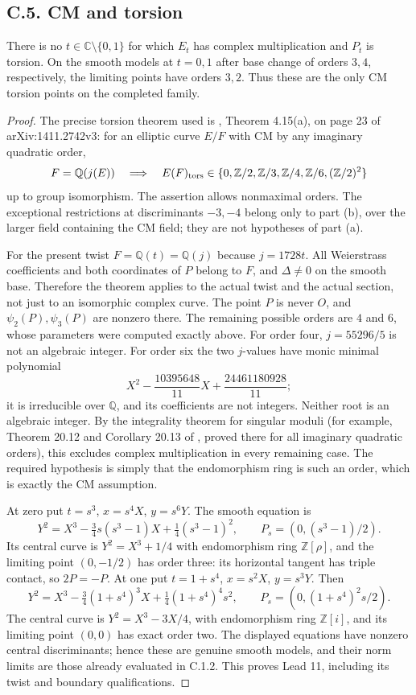 \subsection{C.5. CM and torsion}
\begin{proposition}\label{ari:C.5.1}
There is no $t\in\mathbb C\setminus\{0,1\}$ for which $E_t$ has
complex multiplication and $P_t$ is torsion. On the smooth models
at $t=0,1$ after base change of orders $3,4$, respectively, the
limiting points have orders $3,2$. Thus these are the only CM
torsion points on the completed family.
\end{proposition}
\begin{proof}
The precise torsion theorem used is \cite{BourdonClarkStankewicz2017},
Theorem 4.15(a), on page 23 of arXiv:1411.2742v3:
for an elliptic curve $E/F$ with CM by any imaginary quadratic order,
\[
 F=\mathbb Q(j(E))\quad\Longrightarrow\quad
 E(F)_{\rm tors}\in
 \{0,\mathbb Z/2,\mathbb Z/3,\mathbb Z/4,
       \mathbb Z/6,(\mathbb Z/2)^2\}
\]
up to group isomorphism. The assertion allows nonmaximal orders.
The exceptional restrictions at discriminants $-3,-4$ belong only
to part (b), over the larger field containing the CM field; they
are not hypotheses of part (a).

For the present twist $F=\mathbb Q(t)=\mathbb Q(j)$ because
$j=1728t$. All Weierstrass coefficients and both coordinates of
$P$ belong to $F$, and $\Delta\ne0$ on the smooth base. Therefore
the theorem applies to the actual twist and the actual section,
not just to an isomorphic complex curve. The point $P$ is never
$O$, and $\psi_2(P),\psi_3(P)$ are nonzero there. The remaining
possible orders are $4$ and $6$, whose parameters were computed
exactly above. For order four, $j=55296/5$ is not an algebraic
integer. For order six the two $j$-values have monic minimal
polynomial
\[
 X^2-\frac{10395648}{11}X+\frac{24461180928}{11};
\]
it is irreducible over $\mathbb Q$, and its coefficients are not
integers. Neither root is an algebraic integer. By the integrality
theorem for singular moduli (for example, Theorem 20.12 and
Corollary 20.13 of \cite{Sutherland2023CM}, proved there for all
imaginary quadratic orders), this excludes complex multiplication
in every remaining case. The required hypothesis is simply that
the endomorphism ring is such an order, which is exactly the CM
assumption.

At zero put $t=s^3$, $x=s^4X$, $y=s^6Y$. The smooth equation is
\[
 Y^2=X^3-\tfrac34s(s^3-1)X+\tfrac14(s^3-1)^2,\qquad
 P_s=(0,(s^3-1)/2).
\]
Its central curve is $Y^2=X^3+1/4$ with endomorphism ring
$\mathbb Z[\rho]$, and the limiting point $(0,-1/2)$ has order
three: its horizontal tangent has triple contact, so $2P=-P$.
At one put $t=1+s^4$, $x=s^2X$, $y=s^3Y$. Then
\[
 Y^2=X^3-\tfrac34(1+s^4)^3X+
       \tfrac14(1+s^4)^4s^2,\qquad
 P_s=(0,(1+s^4)^2s/2).
\]
The central curve is $Y^2=X^3-3X/4$, with endomorphism ring
$\mathbb Z[i]$, and its limiting point $(0,0)$ has exact order two.
The displayed equations have nonzero central discriminants; hence
these are genuine smooth models, and their norm limits are those
already evaluated in C.1.2. This proves Lead 11, including its
twist and boundary qualifications.
\end{proof}
